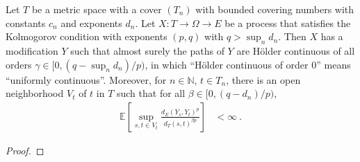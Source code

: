 





\begin{theorem}\label{thm:localized_holder_modification}
  \notready
Let $T$ be a metric space with a cover $(T_n)$ with bounded covering numbers with constants $c_n$ and exponents $d_n$.
Let $X : T \to \Omega \to E$ be a process that satisfies the Kolmogorov condition with exponents $(p, q)$ with $q > \sup_n d_n$.
Then $X$ has a modification $Y$ such that almost surely the paths of $Y$ are Hölder continuous of all orders $\gamma \in [0, (q - \sup_n d_n)/p)$, in which ``Hölder continuous of order 0'' means ``uniformly continuous''.
Moreover, for $n \in \mathbb{N}$, $t \in T_n$, there is an open neighborhood $V_t$ of $t$ in $T$ such that for all $\beta \in [0, (q - d_n)/p)$,
\begin{align*}
  \mathbb{E}\left[ \sup_{s, t \in V_t} \frac{d_E(Y_s, Y_t)^{p}}{d_T(s, t)^{\beta p}} \right]
  &< \infty
  \: .
\end{align*}
\end{theorem}

\begin{proof}

\end{proof}

